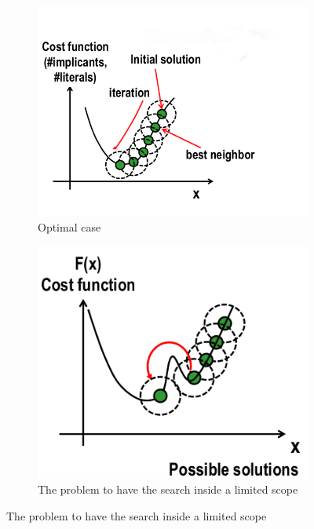 \begin{figure}[H]
	\centering
	\begin{subfigure}[b]{0.55\textwidth}
		\includegraphics[width=\textwidth]{./Cap6/Images/Image6.png}
		\caption{Optimal case}
		\label{fig:heurbest}
	\end{subfigure}
	\quad
	\begin{subfigure}[b]{0.4\textwidth}
		\includegraphics[width=\textwidth]{./Cap6/Images/Image7.png}
		\caption{The problem to have the search inside a limited scope}
		\label{fig:heurproblem}
	\end{subfigure}
\end{figure}

